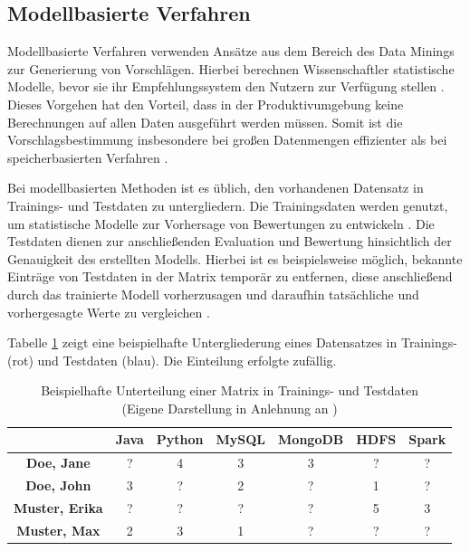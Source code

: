 \subsection{Modellbasierte Verfahren}
\label{ch:empfehlungssysteme:cf:modellbasiert}
Modellbasierte Verfahren verwenden Ansätze aus dem Bereich des Data Minings zur Generierung von Vorschlägen. Hierbei berechnen Wissenschaftler statistische Modelle, bevor sie ihr Empfehlungssystem den Nutzern zur Verfügung stellen \cite[S. 71ff.]{recommenderSystems:2016}\cite[S. 2]{cui:2020}\cite[S. 8]{yang:2016}. Dieses Vorgehen hat den Vorteil, dass in der Produktivumgebung keine Berechnungen auf allen Daten ausgeführt werden müssen. Somit ist die Vorschlagsbestimmung insbesondere bei großen Datenmengen effizienter als bei speicherbasierten Verfahren \cite[S. 8]{yang:2016}.

Bei modellbasierten Methoden ist es üblich, den vorhandenen Datensatz in Trainings- und Testdaten zu untergliedern. Die Trainingsdaten werden genutzt, um statistische Modelle zur Vorhersage von Bewertungen zu entwickeln \cite[S. 71f.]{recommenderSystems:2016}. Die Testdaten dienen zur anschließenden Evaluation und Bewertung hinsichtlich der Genauigkeit des erstellten Modells. Hierbei ist es beispielsweise möglich, bekannte Einträge von Testdaten in der Matrix temporär zu entfernen, diese anschließend durch das trainierte Modell vorherzusagen und daraufhin tatsächliche und vorhergesagte Werte zu vergleichen \cite[S. 3ff.]{kang:2016}.

Tabelle \ref{tbl:empfehlungssysteme:cf:modellbasiert:tbl1} zeigt eine beispielhafte Untergliederung eines Datensatzes in Trainings- (rot) und Testdaten (blau). Die Einteilung erfolgte zufällig.

\begin{table}[h]
	\centering
	\begin{tabular}{c|c|c|c|c|c|c}
		& \textbf{Java} & \textbf{Python} & \textbf{MySQL} & \textbf{MongoDB} & \textbf{HDFS} & \textbf{Spark}\\ 
		\hline
		\textbf{Doe, Jane} & ? & \cellcolor{itemcolor}4 & \cellcolor{itemcolor}3 & \cellcolor{usercolor}3 & ? & ?\\
		\textbf{Doe, John} & \cellcolor{usercolor}3 & ? & \cellcolor{usercolor}2 & ? & \cellcolor{usercolor}1 & ?\\
		\textbf{Muster, Erika} & ? & ? & ? & ? & \cellcolor{itemcolor}5 & \cellcolor{usercolor}3\\
		\textbf{Muster, Max} & \cellcolor{itemcolor}2 & \cellcolor{usercolor}3 & \cellcolor{itemcolor}1 & ? & ? & ?\\
	\end{tabular}
	\caption[Beispielhafte Unterteilung einer Matrix in Trainings- und Testdaten]{Beispielhafte Unterteilung einer Matrix in Trainings- und Testdaten\\
	(Eigene Darstellung in Anlehnung an \cite[S. 72]{recommenderSystems:2016})}
	\label{tbl:empfehlungssysteme:cf:modellbasiert:tbl1}
\end{table}

